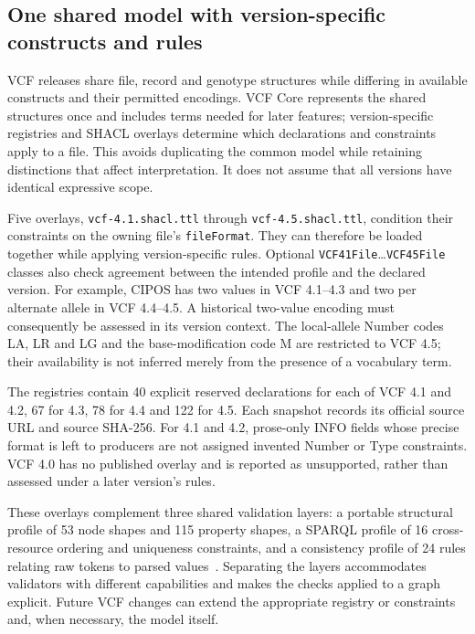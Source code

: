 \documentclass{ceurart}
\newcommand{\term}[1]{\texttt{#1}}
\begin{document}
\subsection{One shared model with version-specific constructs and rules}

VCF releases share file, record and genotype structures while differing in available constructs and their permitted encodings. VCF Core represents the shared structures once and includes terms needed for later features; version-specific registries and SHACL overlays determine which declarations and constraints apply to a file. This avoids duplicating the common model while retaining distinctions that affect interpretation. It does not assume that all versions have identical expressive scope.

Five overlays, \term{vcf-4.1.shacl.ttl} through \term{vcf-4.5.shacl.ttl}, condition their constraints on the owning file's \term{fileFormat}. They can therefore be loaded together while applying version-specific rules. Optional \term{VCF41File}\ldots\term{VCF45File} classes also check agreement between the intended profile and the declared version. For example, CIPOS has two values in VCF 4.1--4.3 and two per alternate allele in VCF 4.4--4.5. A historical two-value encoding must consequently be assessed in its version context. The local-allele Number codes LA, LR and LG and the base-modification code M are restricted to VCF 4.5; their availability is not inferred merely from the presence of a vocabulary term.

The registries contain 40 explicit reserved declarations for each of VCF 4.1 and 4.2, 67 for 4.3, 78 for 4.4 and 122 for 4.5. Each snapshot records its official source URL and source SHA-256. For 4.1 and 4.2, prose-only INFO fields whose precise format is left to producers are not assigned invented Number or Type constraints. VCF 4.0 has no published overlay and is reported as unsupported, rather than assessed under a later version's rules.

These overlays complement three shared validation layers: a portable structural profile of 53 node shapes and 115 property shapes, a SPARQL profile of 16 cross-resource ordering and uniqueness constraints, and a consistency profile of 24 rules relating raw tokens to parsed values~\cite{shacl2017}. Separating the layers accommodates validators with different capabilities and makes the checks applied to a graph explicit. Future VCF changes can extend the appropriate registry or constraints and, when necessary, the model itself.
\end{document}
